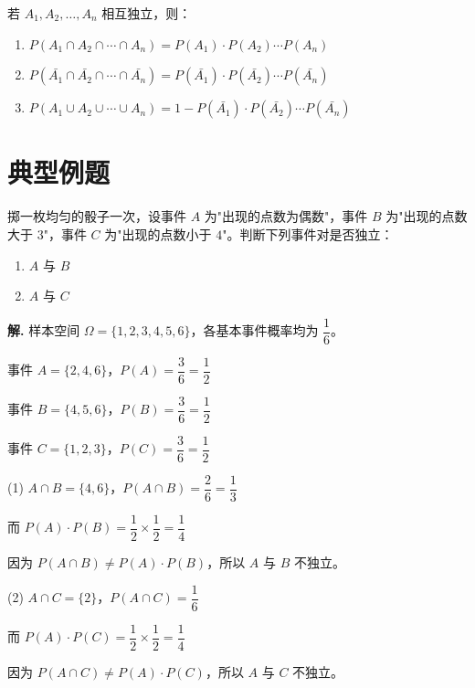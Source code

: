 \documentclass[11pt]{ctexrep}
\begin{document}
\begin{property}[独立事件的概率公式]
    若 $A_1, A_2, \ldots, A_n$ 相互独立，则：
    \begin{enumerate}
        \item $P(A_1 \cap A_2 \cap \cdots \cap A_n) = P(A_1) \cdot P(A_2) \cdots P(A_n)$
        \item $P(\bar{A_1} \cap \bar{A_2} \cap \cdots \cap \bar{A_n}) = P(\bar{A_1}) \cdot P(\bar{A_2}) \cdots P(\bar{A_n})$
        \item $P(A_1 \cup A_2 \cup \cdots \cup A_n) = 1 - P(\bar{A_1}) \cdot P(\bar{A_2}) \cdots P(\bar{A_n})$
    \end{enumerate}
\end{property}

\section*{典型例题}

\begin{example}[独立性的判断]
    掷一枚均匀的骰子一次，设事件 $A$ 为"出现的点数为偶数"，事件 $B$ 为"出现的点数大于 $3$"，事件 $C$ 为"出现的点数小于 $4$"。判断下列事件对是否独立：
    \begin{enumerate}
        \item $A$ 与 $B$
        \item $A$ 与 $C$
    \end{enumerate}
\end{example}

\textbf{解.} 样本空间 $\Omega = \{1, 2, 3, 4, 5, 6\}$，各基本事件概率均为 $\dfrac{1}{6}$。

事件 $A = \{2, 4, 6\}$，$P(A) = \dfrac{3}{6} = \dfrac{1}{2}$

事件 $B = \{4, 5, 6\}$，$P(B) = \dfrac{3}{6} = \dfrac{1}{2}$

事件 $C = \{1, 2, 3\}$，$P(C) = \dfrac{3}{6} = \dfrac{1}{2}$

(1) $A \cap B = \{4, 6\}$，$P(A \cap B) = \dfrac{2}{6} = \dfrac{1}{3}$

而 $P(A) \cdot P(B) = \dfrac{1}{2} \times \dfrac{1}{2} = \dfrac{1}{4}$

因为 $P(A \cap B) \neq P(A) \cdot P(B)$，所以 $A$ 与 $B$ 不独立。

(2) $A \cap C = \{2\}$，$P(A \cap C) = \dfrac{1}{6}$

而 $P(A) \cdot P(C) = \dfrac{1}{2} \times \dfrac{1}{2} = \dfrac{1}{4}$

因为 $P(A \cap C) \neq P(A) \cdot P(C)$，所以 $A$ 与 $C$ 不独立。
\end{document}
